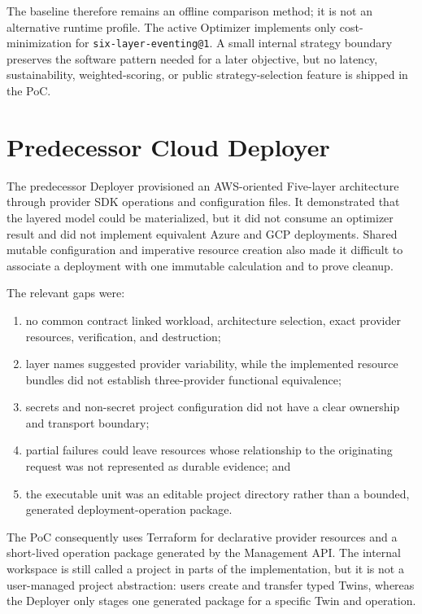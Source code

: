 The baseline therefore remains an offline comparison method; it is not an
alternative runtime profile. The active Optimizer implements only
cost-minimization for \texttt{six-layer-eventing@1}. A small internal strategy
boundary preserves the software pattern needed for a later objective, but no
latency, sustainability, weighted-scoring, or public strategy-selection feature
is shipped in the PoC.

\section{Predecessor Cloud Deployer}
\label{sec:legacy-deployer}

The predecessor Deployer provisioned an AWS-oriented Five-layer architecture
through provider SDK operations and configuration files. It demonstrated that
the layered model could be materialized, but it did not consume an optimizer
result and did not implement equivalent Azure and GCP deployments. Shared
mutable configuration and imperative resource creation also made it difficult
to associate a deployment with one immutable calculation and to prove cleanup.

The relevant gaps were:

\begin{enumerate}
    \item no common contract linked workload, architecture selection, exact
    provider resources, verification, and destruction;
    \item layer names suggested provider variability, while the implemented
    resource bundles did not establish three-provider functional equivalence;
    \item secrets and non-secret project configuration did not have a clear
    ownership and transport boundary;
    \item partial failures could leave resources whose relationship to the
    originating request was not represented as durable evidence; and
    \item the executable unit was an editable project directory rather than a
    bounded, generated deployment-operation package.
\end{enumerate}

The PoC consequently uses Terraform for declarative provider resources and a
short-lived operation package generated by the Management API. The internal
workspace is still called a project in parts of the implementation, but it is
not a user-managed project abstraction: users create and transfer typed Twins,
whereas the Deployer only stages one generated package for a specific Twin and
operation.


